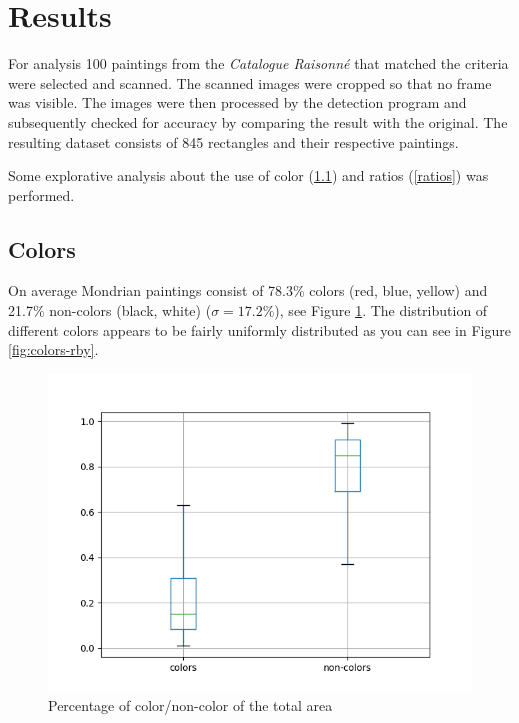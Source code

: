 \section{Results} \label{results}

For analysis 100 paintings from the \textit{Catalogue Raisonn{\'e}}
\cite{joosten1998} that matched the criteria were selected and scanned. The
scanned images were cropped so that no frame was visible. The images were then
processed by the detection program and subsequently checked for accuracy by
comparing the result with the original. The resulting dataset consists of 845
rectangles and their respective paintings.

Some explorative analysis about the use of color (\ref{color}) and ratios
(\ref{ratios}) was performed.

\subsection{Colors} \label{color}

On average Mondrian paintings consist of 78.3\% colors (red, blue, yellow) and
21.7\% non-colors (black, white) ($\sigma = 17.2\%$), see Figure
\ref{fig:colors-noncolors}. The distribution of different colors appears to be
fairly uniformly distributed as you can see in Figure \ref{fig:colors-rby}.

\begin{figure}
\includegraphics[width=\linewidth]{images/colors-non-colors.png}
\caption{Percentage of color/non-color of the total area}
\label{fig:colors-noncolors}
\end{figure}

